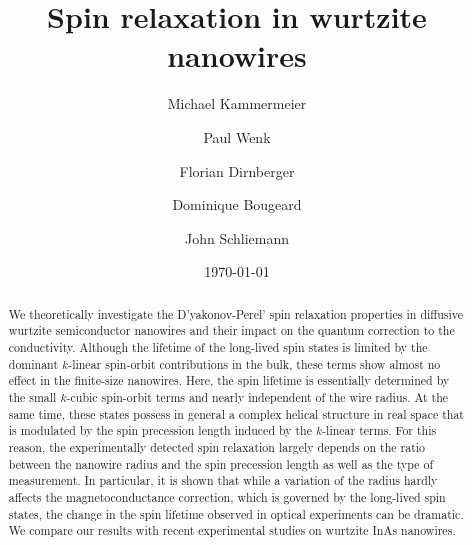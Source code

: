\documentclass[superscriptaddress,noshowpacs,noshowkeys, twocolumn, floatfix,aps, prb,reprint]{revtex4-1}
\begin{document}
\renewcommand{\figurename}{Fig.}
\title{Spin relaxation in wurtzite nanowires}
\author{Michael Kammermeier}
  \author{Paul Wenk}
 \author{Florian Dirnberger}
 \author{Dominique Bougeard}
\author{John Schliemann}
\date{\today }
\begin{abstract}
We theoretically investigate the D'yakonov-Perel' spin relaxation properties in diffusive wurtzite semiconductor nanowires and their impact on the quantum correction to the conductivity. 
Although the lifetime of the long-lived spin states is limited by the dominant $k$-linear spin-orbit contributions in the bulk, these terms show almost no effect in the finite-size nanowires.
Here, the spin lifetime is essentially determined by the small $k$-cubic spin-orbit terms and nearly independent of the wire radius.
At the same time,  these states possess in general a complex helical structure in real space that is modulated by the spin precession length induced by the $k$-linear terms.
For this reason, the experimentally detected spin relaxation largely depends on the ratio between the nanowire radius and the spin precession length as well as the type of measurement. 
In particular, it is shown that while a variation of the radius hardly affects the magnetoconductance correction, which is governed by the long-lived spin states, the change in the spin lifetime observed in optical experiments can be dramatic. 
We compare our results with recent experimental studies on wurtzite InAs nanowires.
\end{abstract}
\maketitle
%
%
\allowdisplaybreaks
\end{document}
